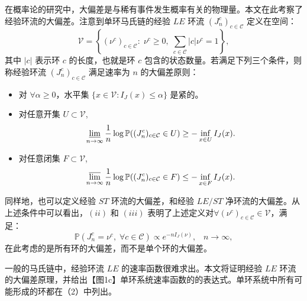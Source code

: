 在概率论的研究中，大偏差是与稀有事件发生概率有关的物理量。本文在此考察了经验环流的大偏差。注意到单环马氏链的经验 $LE$ 环流 $(J_n^c)_{c \in \mathcal{C}}$ 定义在空间：
\begin{equation*}
    \mathcal{V} = \left\{(\nu^c)_{c\in \mathcal{C}}:\;\nu^c\geq 0,\;
    \sum_{c\in \mathcal{C}}|c|\nu^c  = 1\right\},
\end{equation*}
其中 $|c|$ 表示环 $c$ 的长度，也就是环 $c$ 包含的状态数量。若满足下列三个条件，则称经验环流 $(J_n^c)_{c \in \mathcal{C}}$ 满足速率为 $n$ 的大偏差原则：
\begin{itemize}
    \item 对 $\forall \alpha \geqslant 0$，水平集 $\{x \in \mathcal{V}: I_{J}(x) \leqslant \alpha\}$ 是紧的。
    \item 对任意开集 $U \subset \mathcal{V}$,
        \begin{equation}\label{def1}
            \varliminf_{n\to\infty}\frac{1}{n}\log\mathbb{P}((J^c_n)_{c\in\mathcal{C}}\in U)\ge-\inf_{x\in U}I_J(x).
        \end{equation}
    \item 对任意闭集 $F \subset \mathcal{V}$,
        \begin{equation}\label{def2}
            \varlimsup_{n\to \infty}\frac{1}{n}\log\mathbb{P}((J^c_n)_{c\in\mathcal{C}}\in F)\le -\inf_{x\in F}I_J(x).
        \end{equation}
\end{itemize}
同样地，也可以定义经验 $ST$ 环流的大偏差，和经验 $LE/ST$ 净环流的大偏差。从上述条件中可以看出，$(ii)$ 和 $(iii)$ 表明了上述定义对$\forall (\nu^c)_{c\in\mathcal{C}}\in\mathcal{V}$，满足：
\begin{equation}\label{LDP}
    \mathbb{P}(J^c_n=\nu^c,\;\forall c\in\mathcal{C})\propto e^{-n I_J(\nu)},\;\;\;n\to\infty,
\end{equation}
在此考虑的是所有环的大偏差，而不是单个环的大偏差。

一般的马氏链中，经验环流 $LE$ 的速率函数很难求出。本文将证明经验 $LE$ 环流的大偏差原理，并给出【图1c】单环系统速率函数的的表达式。单环系统中所有可能形成的环都在（2）中列出。

